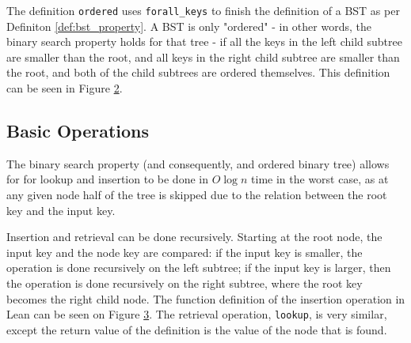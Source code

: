 \begin{figure}[!ht]
  \centering
  
  \caption{}
  \label{lst:forall_keys}
\end{figure}

The definition \lstinline{ordered} uses \lstinline{forall_keys} to finish the definition of a BST as per Definiton \ref{def:bst_property}. A BST is only "ordered" - in other words, the binary search property holds for that tree - 
if all the keys in the left child subtree are smaller than the root, and all keys in the right child subtree are smaller than the root, and both of the child subtrees are ordered themselves. This definition can be seen in Figure \ref{lst:ordered}.

\begin{figure}[!ht]
  \centering
  
  \caption{}
  \label{lst:ordered}
\end{figure}

\subsection*{Basic Operations}
The binary search property (and consequently, and ordered binary tree) allows for for lookup and insertion to be done in $O \log n$ time in the worst case, as at any given node half of the tree is skipped due to the relation between the root key and the input key.

Insertion and retrieval can be done recursively. Starting at the root node, the input key and the node key are compared: if the input key is smaller,
the operation is done recursively on the left subtree; if the input key is larger, then the operation is done recursively on the right subtree, where the root key becomes the right child node.
The function definition of the insertion operation in Lean can be seen on Figure \ref{lst:insert}. The retrieval operation, \lstinline{lookup}, is very similar, except the return value of the definition is the value of the node that is found.

\begin{figure}[!ht]
  \centering
  
  \caption{}
  \label{lst:insert}
\end{figure}

